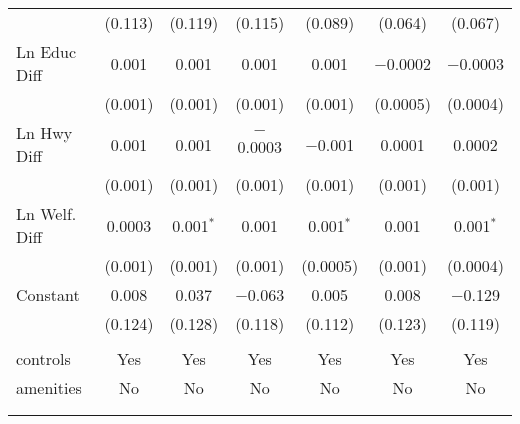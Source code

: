 \begin{table}[!htbp]
\begin{tabular}{@{\extracolsep{5pt}}lcccccc}
  & (0.113) & (0.119) & (0.115) & (0.089) & (0.064) & (0.067) \\ 
  Ln Educ Diff & 0.001 & 0.001 & 0.001 & 0.001 & $-$0.0002 & $-$0.0003 \\ 
  & (0.001) & (0.001) & (0.001) & (0.001) & (0.0005) & (0.0004) \\ 
  Ln Hwy Diff & 0.001 & 0.001 & $-$0.0003 & $-$0.001 & 0.0001 & 0.0002 \\ 
  & (0.001) & (0.001) & (0.001) & (0.001) & (0.001) & (0.001) \\ 
  Ln Welf. Diff & 0.0003 & 0.001$^{*}$ & 0.001 & 0.001$^{*}$ & 0.001 & 0.001$^{*}$ \\ 
  & (0.001) & (0.001) & (0.001) & (0.0005) & (0.001) & (0.0004) \\ 
  Constant & 0.008 & 0.037 & $-$0.063 & 0.005 & 0.008 & $-$0.129 \\ 
  & (0.124) & (0.128) & (0.118) & (0.112) & (0.123) & (0.119) \\ 
 \hline \\[-1.8ex] 
controls & Yes & Yes & Yes & Yes & Yes & Yes \\ 
amenities & No & No & No & No & No & No \\ 
\hline \\[-1.8ex] 
\hline 
\hline \\[-1.8ex] 
\end{tabular} 
\end{table} 
